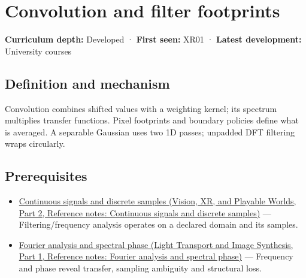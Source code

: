 \hypertarget{appendix-d5b3c692d9f0}{}\label{referencestart:appendix-d5b3c692d9f0}
\section{Convolution and filter footprints}\label{appendix-d5b3c692d9f0-convolution-and-filter-footprints}

\hypertarget{appendix-d5b3c692d9f0-convolution-and-filter-footprints}{}

\textbf{Curriculum depth:} Developed · \textbf{First seen:} XR01 · \textbf{Latest development:} University courses

\begin{allmightroledefinition}

\subsection{Definition and mechanism}\label{appendix-d5b3c692d9f0-definition-and-mechanism}

\hypertarget{appendix-d5b3c692d9f0-definition-and-mechanism}{}

Convolution combines shifted values with a weighting kernel; its spectrum multiplies transfer functions. Pixel footprints and boundary policies define what is averaged. A separable Gaussian uses two 1D passes; unpadded DFT filtering wraps circularly.

\end{allmightroledefinition}

\subsection{Prerequisites}\label{appendix-d5b3c692d9f0-prerequisites}

\hypertarget{appendix-d5b3c692d9f0-prerequisites}{}

\begin{itemize}
\tightlist
\item
  \href{../07-Vision-XR-and-Playable-Worlds-P02/main.pdf\#appendix-1077ea8fc737}{Continuous signals and discrete samples (Vision, XR, and Playable Worlds, Part 2, Reference notes: Continuous signals and discrete samples)} --- Filtering/frequency analysis operates on a declared domain and its samples.
\item
  \href{../04-Light-Transport-and-Image-Synthesis-P01/main.pdf\#appendix-b60686ba06a1}{Fourier analysis and spectral phase (Light Transport and Image Synthesis, Part 1, Reference notes: Fourier analysis and spectral phase)} --- Frequency and phase reveal transfer, sampling ambiguity and structural loss.
\end{itemize}

